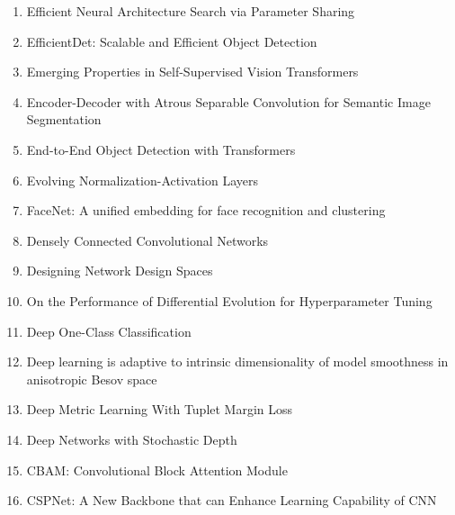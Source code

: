 \documentclass[acmlarge]{acmart}
\begin{document}
\begin{enumerate}
	\item Efficient Neural Architecture Search via Parameter Sharing \cite{Pham2018EfficientNA} 

	\item EfficientDet: Scalable and Efficient Object Detection \cite{Tan2020EfficientDetSA} 

	\item Emerging Properties in Self-Supervised Vision Transformers \cite{Caron2021EmergingPI} 

	\item Encoder-Decoder with Atrous Separable Convolution for Semantic Image Segmentation \cite{Chen2018EncoderDecoderWA} 

	\item End-to-End Object Detection with Transformers \cite{Carion2020EndtoEndOD} 

	\item Evolving Normalization-Activation Layers \cite{Liu2020EvolvingNL} 

	\item FaceNet: A unified embedding for face recognition and clustering \cite{Schroff2015FaceNetAU} 

	\item Densely Connected Convolutional Networks \cite{Huang2017DenselyCC} 

	\item Designing Network Design Spaces \cite{Radosavovic2020DesigningND} 

	\item On the Performance of Differential Evolution for Hyperparameter Tuning \cite{Schmidt2019OnTP} 

	\item Deep One-Class Classification \cite{Ruff2018DeepOC} 

	\item Deep learning is adaptive to intrinsic dimensionality of model smoothness in anisotropic Besov space \cite{Suzuki2019DeepLI} 

	\item Deep Metric Learning With Tuplet Margin Loss \cite{Yu2019DeepML} 

	\item Deep Networks with Stochastic Depth \cite{Huang2016DeepNW} 

	\item CBAM: Convolutional Block Attention Module \cite{Woo2018CBAMCB} 

	\item CSPNet: A New Backbone that can Enhance Learning Capability of CNN \cite{Wang2020CSPNetAN} 


\end{enumerate}
\end{document}
